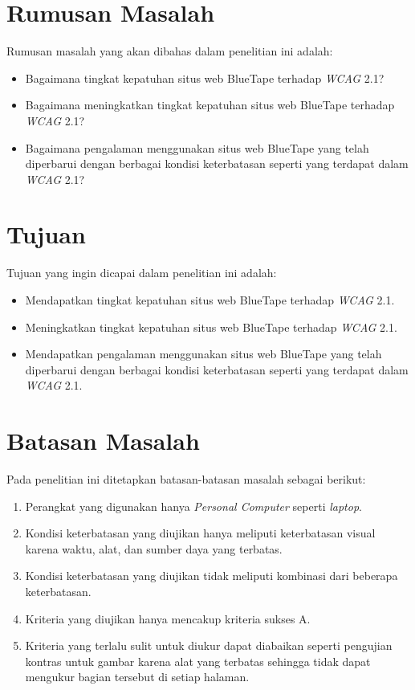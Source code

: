 \section{Rumusan Masalah}
\label{sec:rumusan}
Rumusan masalah yang akan dibahas dalam penelitian ini adalah: 
\begin{itemize}
	\item Bagaimana tingkat kepatuhan situs web BlueTape terhadap \textit{WCAG} 2.1?
	\item Bagaimana meningkatkan tingkat kepatuhan situs web BlueTape terhadap \textit{WCAG} 2.1?  
	\item Bagaimana pengalaman menggunakan situs web BlueTape yang telah diperbarui dengan berbagai kondisi keterbatasan seperti yang terdapat dalam \textit{WCAG} 2.1?
\end{itemize}

\section{Tujuan}
\label{sec:tujuan}
Tujuan yang ingin dicapai dalam penelitian ini adalah:
\begin{itemize}
	\item Mendapatkan tingkat kepatuhan situs web BlueTape terhadap \textit{WCAG} 2.1.
	\item Meningkatkan tingkat kepatuhan situs web BlueTape terhadap \textit{WCAG} 2.1.
	\item Mendapatkan pengalaman menggunakan situs web BlueTape yang telah diperbarui dengan berbagai kondisi keterbatasan seperti yang terdapat dalam \textit{WCAG} 2.1.
\end{itemize}

\section{Batasan Masalah}
\label{sec:batasan}
Pada penelitian ini ditetapkan batasan-batasan masalah sebagai berikut:
\begin{enumerate}
	\item Perangkat yang digunakan hanya \textit{Personal Computer} seperti \textit{laptop}.
	\item Kondisi keterbatasan yang diujikan hanya meliputi keterbatasan visual karena waktu, alat, dan sumber daya yang terbatas.
	\item Kondisi keterbatasan yang diujikan tidak meliputi kombinasi dari beberapa keterbatasan.
	\item Kriteria yang diujikan hanya mencakup kriteria sukses A.
	\item Kriteria yang terlalu sulit untuk diukur dapat diabaikan seperti pengujian kontras untuk gambar karena alat yang terbatas sehingga tidak dapat mengukur bagian tersebut di setiap halaman.
\end{enumerate}

